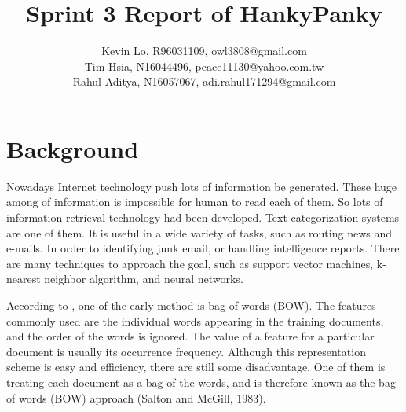 \documentclass[a4paper,twocolumn]{article} %
\begin{document}

\title{Sprint 3 Report of HankyPanky}
\author{Kevin Lo, R96031109, owl3808@gmail.com \\ Tim Hsia, N16044496, peace11130@yahoo.com.tw \\ Rahul Aditya, N16057067, adi.rahul171294@gmail.com}

\maketitle                     %





\section*{Background}
\label{sec:prob}

Nowadays Internet technology push lots of information be generated. These huge among of information is impossible for human to read each of them. So lots of information retrieval technology had been developed. Text categorization systems are one of them. It is useful in a wide variety of tasks, such as routing news and e-mails. In order to identifying junk email, or handling intelligence reports. There are many techniques to approach the goal, such as support vector machines, k-nearest neighbor algorithm, and neural networks.
  
According to \cite{Gabrilovich:2007:HEH:1314498.1314573}, one of the early method is bag of words (BOW). The features commonly used are the individual words appearing in the training documents, and the order of the words is ignored. The value of a feature for a particular document is usually its occurrence frequency. Although this representation scheme is easy and efficiency,  there are still some disadvantage. One of them is treating each document as a bag of the words, and is therefore known as the bag of words (BOW) approach (Salton and McGill, 1983).
  
\end{document}
